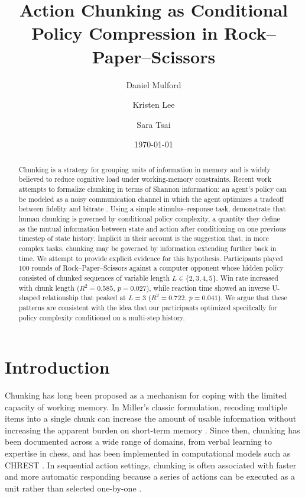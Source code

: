 \documentclass[11pt]{article}
\title{Action Chunking as Conditional Policy Compression in Rock--Paper--Scissors}
\author{Daniel Mulford \and Kristen Lee \and Sara Tsai}
\date{\today}
\begin{document}
\maketitle

\begin{abstract}
Chunking is a strategy for grouping units of information in memory and is widely believed to reduce cognitive load under working-memory constraints. Recent work attempts to formalize chunking in terms of Shannon information: an agent's policy can be modeled as a noisy communication channel in which the agent optimizes a tradeoff between fidelity and bitrate \citep{gershman2021reward}. Using a simple stimulus--response task, \citet{lai2025action} demonstrate that human chunking is governed by conditional policy complexity, a quantity they define as the mutual information between state and action after conditioning on one previous timestep of state history. Implicit in their account is the suggestion that, in more complex tasks, chunking may be governed by information extending further back in time. We attempt to provide explicit evidence for this hypothesis. Participants played 100 rounds of Rock--Paper--Scissors against a computer opponent whose hidden policy consisted of chunked sequences of variable length $L \in \{2, 3, 4, 5\}$. Win rate increased with chunk length ($R^2 = 0.585$, $p = 0.027$), while reaction time showed an inverse U-shaped relationship that peaked at $L = 3$ ($R^2 = 0.722$, $p = 0.041$). We argue that these patterns are consistent with the idea that our participants optimized specifically for policy complexity conditioned on a multi-step history.
\end{abstract}

\section{Introduction}

Chunking has long been proposed as a mechanism for coping with the limited capacity of working memory. In Miller's classic formulation, recoding multiple items into a single chunk can increase the amount of usable information without increasing the apparent burden on short-term memory \citep{miller1956magical}. Since then, chunking has been documented across a wide range of domains, from verbal learning to expertise in chess, and has been implemented in computational models such as CHREST \citep{gobet2001chunking}. In sequential action settings, chunking is often associated with faster and more automatic responding because a series of actions can be executed as a unit rather than selected one-by-one \citep{dezfouli2012habits}.
\end{document}
